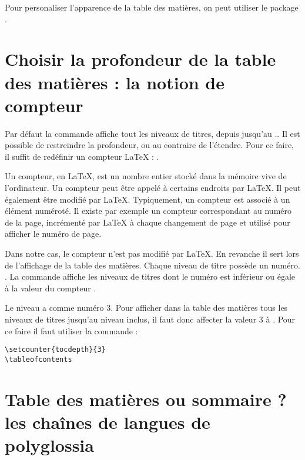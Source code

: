 \begin{plusloins}

Pour personaliser l'apparence de la table des matières, on peut utiliser le package . 
\end{plusloins}

\section[Choix de la profondeur]{Choisir la profondeur de la table des matières : la notion de compteur}\label{tocdepth}

Par défaut la commande  affiche tout les niveaux de titres, depuis  jusqu'au .. Il est possible de restreindre la profondeur, ou au contraire de l'étendre. Pour ce faire, il suffit de redéfinir un compteur \LaTeX{} : .

Un compteur, en \LaTeX{}, est un nombre entier stocké dans la mémoire vive de l'ordinateur. Un compteur peut être appelé à certains endroits par \LaTeX{}. Il peut également être modifié par \LaTeX{}. Typiquement, un compteur est associé à un élément numéroté. Il existe par exemple un compteur  correspondant au numéro de la page, incrémenté par \LaTeX{} à chaque changement de page et utilisé pour afficher le numéro de page.\label{compteur}

Dans notre cas, le compteur  n'est pas modifié par \LaTeX{}. En revanche il sert lors de l'affichage de la table des matières. Chaque niveau de titre possède un numéro. . La commande  affiche les niveaux de titres dont le numéro est inférieur ou égale à la valeur du compteur .

Le niveau  a comme numéro 3. Pour afficher dans la table des matières tous les niveaux de titres jusqu'au niveau  inclus, il faut donc affecter la valeur 3 à  . Pour ce faire il faut utiliser la commande  :

\begin{verbatim}
\setcounter{tocdepth}{3}
\tableofcontents
\end{verbatim}

\section[Table des matières ou sommaire ?]{Table des matières ou sommaire ? les chaînes de langues de polyglossia}


